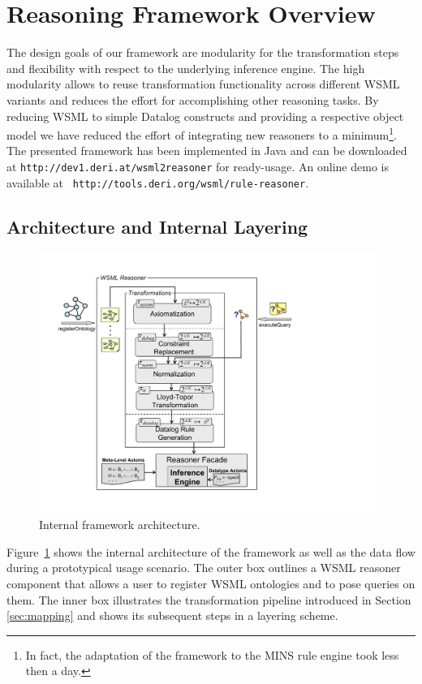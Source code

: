 \section{Reasoning Framework Overview\label{sec:framework}}

The design goals of our framework are modularity for the
transformation steps and flexibility with respect to the
underlying inference engine. The high modularity allows to reuse
transformation functionality across different WSML variants and
reduces the effort for accomplishing other reasoning tasks. By
reducing WSML to simple Datalog constructs and providing a
respective object model we have reduced the effort of integrating
new reasoners to a minimum\footnote{In fact, the adaptation of the
framework to the MINS rule engine took less then a day.}. The
presented framework has been implemented in Java and can be
downloaded at {\tt http://dev1.deri.at/wsml2reasoner} for
ready-usage. An online demo is available at {\tt
http://tools.deri.org/wsml/rule-reasoner}.

\subsection{Architecture and Internal Layering}
\begin{figure}[]
    \includegraphics[width=11cm]{figures/layering}
    \centering
    \caption{Internal framework architecture. \label{fig:layering}}
\end{figure}
Figure~\ref{fig:layering} shows the internal architecture of the
framework as well as the data flow during a prototypical usage
scenario. The outer box outlines a WSML reasoner component that
allows a user to register WSML ontologies and to pose queries on
them. The inner box illustrates the transformation pipeline
introduced in Section \ref{sec:mapping} and shows its subsequent
steps in a layering scheme.

